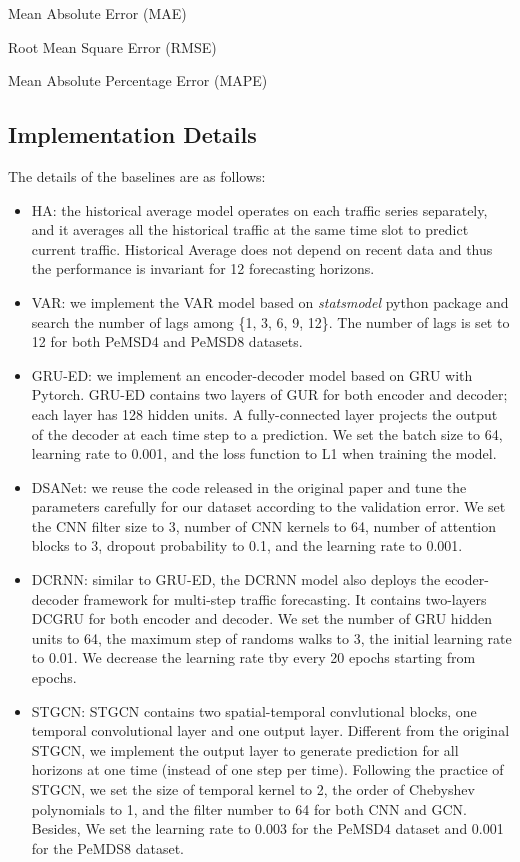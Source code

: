 \documentclass{article}
\begin{document}
Mean Absolute Error (MAE)


Root Mean Square Error (RMSE)


Mean Absolute Percentage Error (MAPE)


\subsection{Implementation Details}
The details of the baselines are as follows:
\begin{itemize}
    \item HA: the historical average model operates on each traffic series separately, and it averages all the historical traffic at the same time slot to predict current traffic. Historical Average does not depend on recent data and thus the performance is invariant for 12 forecasting horizons. 
    \item VAR: we implement the VAR model based on \textit{statsmodel} python package and search the number of lags among \{1, 3, 6, 9, 12\}. The number of lags is set to 12 for both PeMSD4 and PeMSD8 datasets.
    \item GRU-ED: we implement an encoder-decoder model based on GRU with Pytorch. GRU-ED contains two layers of GUR for both encoder and decoder; each layer has 128 hidden units. A fully-connected layer projects the output of the decoder at each time step to a prediction. We set the batch size to 64, learning rate to 0.001, and the loss function to L1 when training the model.
    \item DSANet: we reuse the code released in the original paper and tune the parameters carefully for our dataset according to the validation error. We set the CNN filter size to 3, number of CNN kernels to 64, number of attention blocks to 3, dropout probability to 0.1, and the learning rate to 0.001.
    \item DCRNN: similar to GRU-ED, the DCRNN model also deploys the ecoder-decoder framework for multi-step traffic forecasting. It contains two-layers DCGRU for both encoder and decoder. We set the number of GRU hidden units to 64, the maximum step of randoms walks to 3, the initial learning rate to 0.01. We decrease the learning rate tby  every 20 epochs starting from  epochs.
    \item STGCN: STGCN contains two spatial-temporal convlutional blocks, one temporal convolutional layer and one output layer. Different from the original STGCN, we implement the output layer to generate prediction for all horizons at one time (instead of one step per time). Following the practice of STGCN, we set the size of temporal kernel to 2, the order of Chebyshev polynomials to 1, and the filter number to 64 for both CNN and GCN. Besides, We set the learning rate to 0.003 for the PeMSD4 dataset and 0.001 for the PeMDS8 dataset.

\end{itemize}
\end{document}
